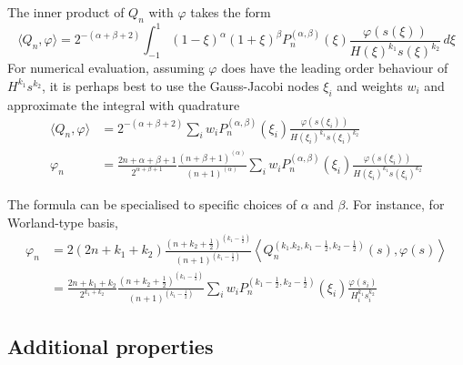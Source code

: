 %
The inner product of $Q_n$ with $\varphi$ takes the form
%
\[
    \langle Q_n, \varphi \rangle = 2^{-(\alpha + \beta + 2)} \int_{-1}^{1} (1 - \xi)^\alpha (1 + \xi)^\beta P_n^{(\alpha, \beta)}(\xi) \frac{\varphi(s(\xi))}{H(\xi)^{k_1} s(\xi)^{k_2}}\, d\xi
\]
%
For numerical evaluation, assuming $\varphi$ does have the leading order behaviour of $H^{k_1} s^{k_2}$, it is perhaps best to use the Gauss-Jacobi nodes $\xi_i$ and weights $w_i$ and approximate the integral with quadrature
%
\begin{equation}
\begin{aligned}
    \langle Q_n, \varphi \rangle &= 2^{-(\alpha + \beta + 2)} \sum_i w_i P_n^{(\alpha, \beta)}(\xi_i) \frac{\varphi(s(\xi_i))}{H(\xi_i)^{k_1} s(\xi_i)^{k_2}} \\ 
    \varphi_n &= \frac{2n + \alpha + \beta + 1}{2^{\alpha + \beta + 1}} \frac{(n + \beta + 1)^{(\alpha)}}{(n + 1)^{(\alpha)}} \sum_i w_i P_n^{(\alpha, \beta)}(\xi_i) \frac{\varphi(s(\xi_i))}{H(\xi_i)^{k_1} s(\xi_i)^{k_2}}
\end{aligned}
\end{equation}
%

The formula can be specialised to specific choices of $\alpha$ and $\beta$. For instance, for Worland-type basis, 
%
\[\begin{aligned}
    \varphi_n &= 2(2n + k_1 + k_2) \frac{(n + k_2 + \frac{1}{2})^{(k_1 - \frac{1}{2})}}{(n + 1)^{(k_1 - \frac{1}{2})}} \left\langle Q_n^{(k_1. k_2, k_1 - \frac{1}{2}, k_2 - \frac{1}{2})}(s), \varphi(s) \right\rangle \\ 
    &= \frac{2n + k_1 + k_2}{2^{k_1 + k_2}} \frac{(n + k_2 + \frac{1}{2})^{(k_1 - \frac{1}{2})}}{(n + 1)^{(k_1 - \frac{1}{2})}} \sum_i w_i P_n^{(k_1 - \frac{1}{2}, k_2 - \frac{1}{2})}(\xi_i) \frac{\varphi(s_i)}{H_i^{k_1} s_i^{k_2}}
\end{aligned}\]
%


\subsection{Additional properties}

